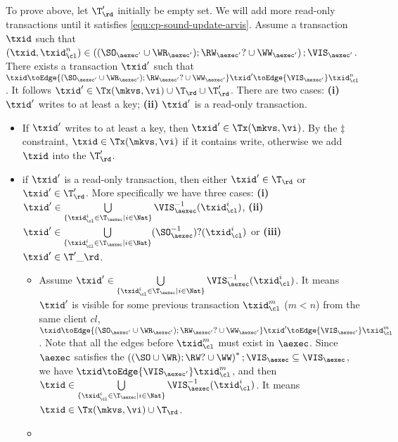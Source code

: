 To prove above, let \( \T'_\rd \) initially be empty set.
We will add more read-only transactions until it satisfies \cref{equ:cp-sound-update-arvis}.
Assume a transaction \( \txid \) such that 
\( (\txid, \txid_\cl^n) \in \left( (\SO_{\aexec'} \cup \WR_{\aexec'} ) ; \RW_{\aexec'}? \cup \WW_{\aexec'} \right) ; \VIS_{\aexec'}\).
There exists a transaction \( \txid' \) such that \( \txid \toEdge{(\SO_{\aexec'} \cup \WR_{\aexec'} ) ; \RW_{\aexec'}? \cup \WW_{\aexec'}} \txid' \toEdge{\VIS_{\aexec'}}  \txid_\cl^n \).
It follows \( \txid'  \in \Tx(\mkvs, \vi) \cup \T_\rd \cup \T'_\rd  \).
There are two cases: \textbf{(i)} \( \txid' \) writes to at least a key; \textbf{(ii)} \( \txid' \) is a read-only transaction.
\begin{itemize}
    \item
    If \( \txid' \) writes to at least a key, then \( \txid' \in \Tx(\mkvs, \vi)\).
    By the \( \ddagger \) constraint, \( \txid \in \Tx(\mkvs, \vi)\) if it contains write,
    otherwise we add \( \txid \) into the \( \T'_\rd \).
    \item 
    if \( \txid' \) is a read-only transaction, then either \( \txid' \in \T_\rd \) or \( \txid' \in \T'_\rd \).
    More specifically we have three cases: \textbf{(i)} \( \txid' \in \bigcup\limits_{\{\txid_{\cl}^{i} \in \T_{\aexec} \mid i \in \Nat\}} \VIS_{\aexec}^{-1}(\txid^i_\cl) \), \textbf{(ii)} \( \txid' \in \bigcup\limits_{\{\txid_{\cl}^{i} \in \T_{\aexec} \mid i \in \Nat\}} (\SO_{\aexec}^{-1})?(\txid^i_\cl) \) or \textbf{(iii)} \( \txid' \in \T'\_\rd\).
    \begin{itemize}
        \item
        Assume \( \txid' \in \bigcup\limits_{\{\txid_{\cl}^{i} \in \T_{\aexec} \mid i \in \Nat\}} \VIS_{\aexec}^{-1}(\txid^i_\cl) \).
        It means \( \txid' \) is visible for some previous transaction \( \txid_\cl^m \) (\( m < n \)) from the same client \( cl \), 
        \ie \( \txid \toEdge{(\SO_{\aexec'} \cup \WR_{\aexec'} ) ; \RW_{\aexec'}? \cup \WW_{\aexec'}} \txid' \toEdge{\VIS_{\aexec'}}  \txid_\cl^m \).
        Note that all the edges before \( \txid_\cl^m \) must exist in \( \aexec \).
        Since \( \aexec \) satisfies the \( \left( (\SO \cup \WR ) ; \RW? \cup \WW \right)^* ; \VIS_\aexec \subseteq \VIS_\aexec \),
        we have \( \txid \toEdge{\VIS_{\aexec'}} \txid_\cl^m \), and then \( \txid \in \bigcup\limits_{\{\txid_{\cl}^{i} \in \T_{\aexec} \mid i \in \Nat\}} \VIS_{\aexec}^{-1}(\txid^i_\cl)\).
        It means \( \txid \in \Tx(\mkvs, \vi) \cup \T_\rd \).
    \item 

\end{itemize}
\end{itemize}
